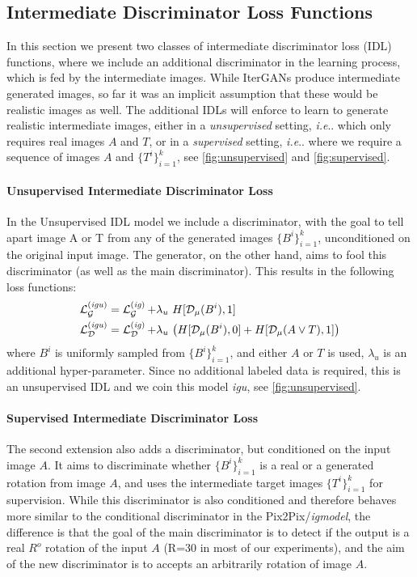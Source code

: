 \documentclass[runningheads]{llncs}
\makeatletter
\DeclareRobustCommand\onedot{\futurelet\@let@token\@onedot}
\def\@onedot{\ifx\@let@token.\else.\null\fi\xspace}
\def\ie{\emph{i.e}\onedot} \def\Ie{\emph{I.e}\onedot}
\newcommand{\myparagraph}[1]{\vspace{-2mm}\paragraph{\textbf{#1}}}
\let\wip\emph
\makeatother
\begin{document}
\subsection{Intermediate Discriminator Loss Functions}
In this section we present two classes of intermediate discriminator loss (IDL) functions, where we include an additional discriminator in the learning process, which is fed by the intermediate images.
While IterGANs produce intermediate generated images, so far it was an implicit assumption that these would be realistic images as well.  
The additional IDLs will enforce to learn to generate realistic intermediate images, either in a \emph{unsupervised} setting, \ie which only requires real images $A$ and $T$, or in a \emph{supervised} setting, \ie where we require a sequence of images $A$ and $\{T^i\}_{i=1}^{k}$, see \autoref{fig:unsupervised} and \autoref{fig:supervised}.

\myparagraph{Unsupervised Intermediate Discriminator Loss}
In the Unsupervised IDL model we include a discriminator, with the goal to tell apart image A or T from any of the generated images $\{B^i\}_{i=1}^k$,  unconditioned on the original input image.
The generator, on the other hand, aims to fool this discriminator (as well as the main discriminator).
This results in the following loss functions:
\begin{align}
	\LL_\Gen^{(\text{\wip{igu}})} &= \LL_\Gen^{(\text{\wip{ig}})} + \lambda_u \ H[\Dis_\mu(B^i), 1]\label{eq:mm-lgen-m3} \\
	\LL_\Dis^{(\text{\wip{igu}})} &= \LL_\Dis^{(\text{\wip{ig}})} + \lambda_u \ \big( H[\Dis_\mu(B^i), 0] + H[\Dis_\mu(A \lor T), 1] \big) \label{eq:mm-ldis-m3}
\end{align}
where $B^i$ is uniformly sampled from $\{B^i\}_{i=1}^k$, and either $A$ or $T$ is used, $\lambda_u$ is an additional hyper-parameter.
Since no additional labeled data is required, this is an unsupervised IDL and we coin this model \wip{igu}, see \autoref{fig:unsupervised}.

\myparagraph{Supervised Intermediate Discriminator Loss}
The second extension also adds a discriminator, but conditioned on the input image $A$. 
It aims to discriminate whether $\{B^i\}_{i=1}^k$ is a real or a generated rotation from image $A$, and uses the intermediate target images $\{T^i\}_{i=1}^k$ for supervision. 
While this discriminator is also conditioned and therefore behaves more similar to the conditional discriminator in the Pix2Pix/\wip{igmodel}, the difference is that the goal of the main discriminator is to detect if the output is a real $R^o$ rotation of the input $A$ (R=30 in most of our experiments), and the aim of the new discriminator is to accepts an arbitrarily rotation of image $A$.
\end{document}
